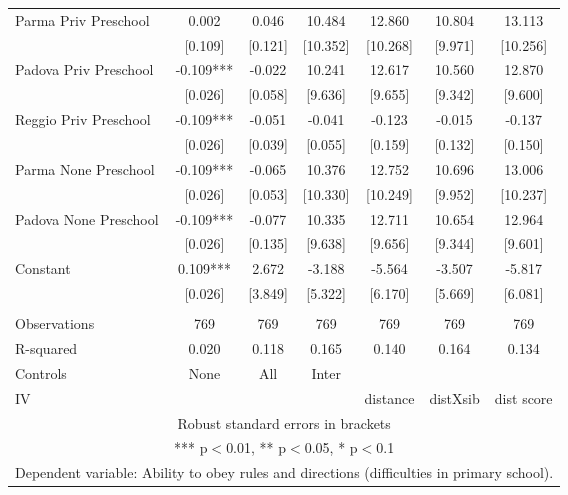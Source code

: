 \begin{tabular}{lcccccc}
Parma Priv Preschool & 0.002 & 0.046 & 10.484 & 12.860 & 10.804 & 13.113 \\
 & [0.109] & [0.121] & [10.352] & [10.268] & [9.971] & [10.256] \\
Padova Priv Preschool & -0.109*** & -0.022 & 10.241 & 12.617 & 10.560 & 12.870 \\
 & [0.026] & [0.058] & [9.636] & [9.655] & [9.342] & [9.600] \\
Reggio Priv Preschool & -0.109*** & -0.051 & -0.041 & -0.123 & -0.015 & -0.137 \\
 & [0.026] & [0.039] & [0.055] & [0.159] & [0.132] & [0.150] \\
Parma None Preschool & -0.109*** & -0.065 & 10.376 & 12.752 & 10.696 & 13.006 \\
 & [0.026] & [0.053] & [10.330] & [10.249] & [9.952] & [10.237] \\
Padova None Preschool & -0.109*** & -0.077 & 10.335 & 12.711 & 10.654 & 12.964 \\
 & [0.026] & [0.135] & [9.638] & [9.656] & [9.344] & [9.601] \\
Constant & 0.109*** & 2.672 & -3.188 & -5.564 & -3.507 & -5.817 \\
 & [0.026] & [3.849] & [5.322] & [6.170] & [5.669] & [6.081] \\
 &  &  &  &  &  &  \\
Observations & 769 & 769 & 769 & 769 & 769 & 769 \\
R-squared & 0.020 & 0.118 & 0.165 & 0.140 & 0.164 & 0.134 \\
Controls & None & All & Inter &  &  &  \\
 IV &  &  &  & distance & distXsib & dist score \\ \hline
\multicolumn{7}{c}{ Robust standard errors in brackets} \\
\multicolumn{7}{c}{ *** p$<$0.01, ** p$<$0.05, * p$<$0.1} \\
\multicolumn{7}{c}{ Dependent variable: Ability to obey rules and directions (difficulties in primary school).} \\
\end{tabular}
